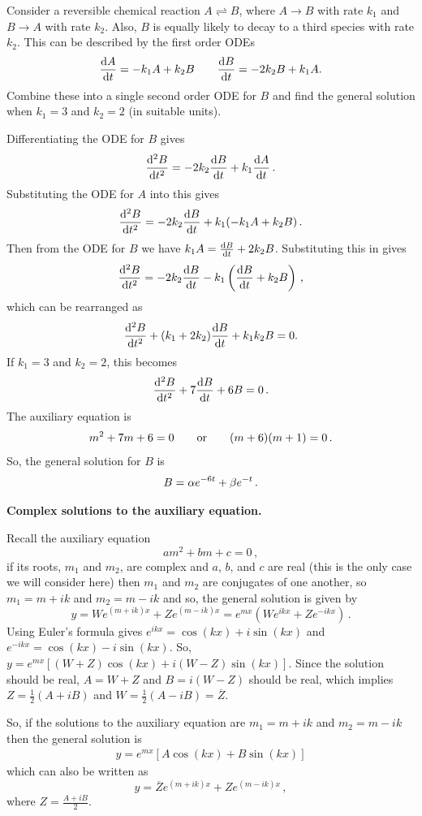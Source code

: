 \goodbreak
\begin{example}[Video]
\label{ex:663}
Consider a reversible chemical reaction $A\rightleftharpoons B$, where $A\to B$ with rate $k_1$ and $B\to A$ with rate $k_2$. Also, $B$ is equally likely to decay to a third species with rate $k_2$. This can be described by the first order ODEs
\[
\frac{{\rm d} A}{{\rm d} t}=-k_1A+k_2B\qquad
\frac{{\rm d} B}{{\rm d} t}=-2k_2B+k_1A.
\]
Combine these into a single second order ODE for $B$ and find the general solution when $k_1=3$ and $k_2=2$ (in suitable units).
\end{example}
\begin{solution}
Differentiating the ODE for $B$ gives
\[
\frac{{\rm d} ^2B}{{\rm d} t^2}=-2k_2\frac{{\rm d} B}{{\rm d} t}+k_1\frac{{\rm d} A}{{\rm d} t}\, .
\]
Substituting the ODE for $A$ into this gives
\[
\frac{{\rm d} ^2B}{{\rm d} t^2}=-2k_2\frac{{\rm d} B}{{\rm d} t}+k_1(-k_1A+k_2B)\, .
\]
Then from the ODE for $B$ we have $k_1A=\frac{{\rm d} B}{{\rm d} t}+2k_2B$. Substituting this in gives
\[
\frac{{\rm d} ^2B}{{\rm d} t^2}=-2k_2\frac{{\rm d} B}{{\rm d} t}-k_1\left(\frac{{\rm d} B}{{\rm d} t}+k_2B\right)\, ,
\]
which can be rearranged as
\[
\frac{{\rm d} ^2B}{{\rm d} t^2}+(k_1+2k_2)\frac{{\rm d} B}{{\rm d} t}+k_1k_2B=0.
\]
If $k_1=3$ and $k_2=2$, this becomes
\[
\frac{{\rm d} ^2B}{{\rm d} t^2}+7\frac{{\rm d} B}{{\rm d} t}+6B=0\, .
\]
The auxiliary equation is
\[
m^2+7m+6=0\qquad\text{or}\qquad(m+6)(m+1)=0\, .
\]
So, the general solution for $B$ is
\[
B=\alpha e^{-6t}+\beta e^{-t}\, .
\]
\end{solution}


\textbf{Complex solutions to the auxiliary equation.}

Recall the auxiliary equation
\[
a{m}^{2}+bm+c=0\, ,
\]
if its roots, ${m}_{1}$ and ${m}_{2}$, are complex and $a$, $b$, and $c$ are real (this is the only case we will consider here) then ${m}_{1}$ and ${m}_{2}$ are conjugates of one another, so ${m}_{1}=m+ik$ and ${m}_{2}=m-ik$ and so, the general solution is given by
\[
y=W{e}^{(m+ik)x}+Z{e}^{(m-ik)x} ={e}^{mx}\left(W{e}^{ikx}+Z{e}^{-ikx}\right) \, .
\]
Using Euler's formula gives ${e}^{ikx}=\cos (kx)+i\sin \left(kx\right)$ and ${e}^{-ikx}=\cos (kx)-i\sin \left(kx\right)$. So, $y={e}^{mx}\left[\left(W+Z\right)\cos \left(kx\right)+i\left(W-Z\right)\sin \left(kx\right)\right]$. Since the solution should be real, $A=W+Z$ and $B=i\left(W-Z\right)$ should be real, which implies $Z=\frac{1}{2}(A+iB)$ and $W=\frac{1}{2}\left(A-iB\right)=\overline{Z}$.

So, if the solutions to the auxiliary equation are ${m}_{1}=m+ik$ and ${m}_{2}=m-ik$ then the general solution is
\begin{align}
y={e}^{mx}\left[A\cos \left(kx\right)+B\sin \left(kx\right)\right]
\end{align}
which can also be written as
\[
y=\overline{Z}{e}^{(m+ik)x}+Z{e}^{(m-ik)x} \, ,
\]
where $Z=\frac{A+iB}{2}$.


